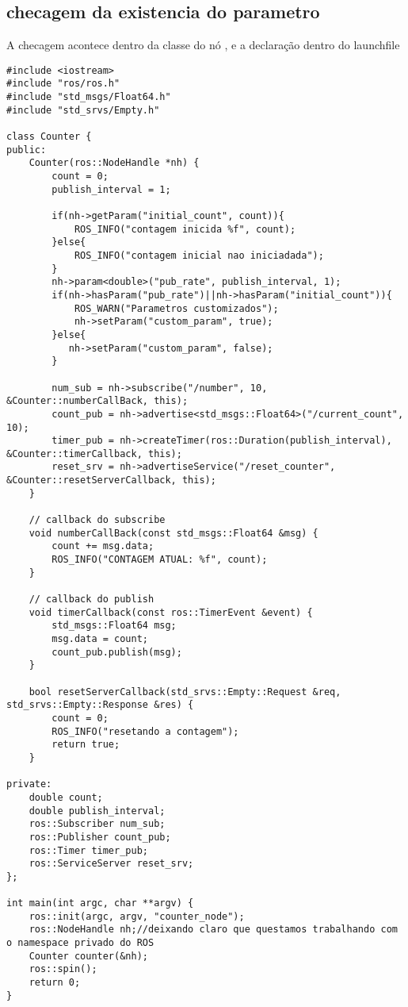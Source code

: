 \documentclass[letterpaper]{article}
\begin{document}
\subsection{checagem da existencia do parametro}
A checagem acontece dentro da classe do nó , e a declaração dentro do launchfile
\begin{lstlisting}[style=cppStyle, title=counter.cpp]
#include <iostream>
#include "ros/ros.h"
#include "std_msgs/Float64.h"
#include "std_srvs/Empty.h"

class Counter {
public:
    Counter(ros::NodeHandle *nh) {
        count = 0;                                                                           
        publish_interval = 1;

        if(nh->getParam("initial_count", count)){
            ROS_INFO("contagem inicida %f", count);
        }else{
            ROS_INFO("contagem inicial nao iniciadada");
        }
        nh->param<double>("pub_rate", publish_interval, 1);
        if(nh->hasParam("pub_rate")||nh->hasParam("initial_count")){
            ROS_WARN("Parametros customizados");
            nh->setParam("custom_param", true);
        }else{
           nh->setParam("custom_param", false); 
        }

        num_sub = nh->subscribe("/number", 10, &Counter::numberCallBack, this);
        count_pub = nh->advertise<std_msgs::Float64>("/current_count", 10);
        timer_pub = nh->createTimer(ros::Duration(publish_interval), &Counter::timerCallback, this);
        reset_srv = nh->advertiseService("/reset_counter", &Counter::resetServerCallback, this);
    }

    // callback do subscribe
    void numberCallBack(const std_msgs::Float64 &msg) {
        count += msg.data;
        ROS_INFO("CONTAGEM ATUAL: %f", count);
    }

    // callback do publish
    void timerCallback(const ros::TimerEvent &event) {
        std_msgs::Float64 msg;
        msg.data = count;
        count_pub.publish(msg); 
    }

    bool resetServerCallback(std_srvs::Empty::Request &req, std_srvs::Empty::Response &res) {
        count = 0;
        ROS_INFO("resetando a contagem");
        return true;
    }

private:
    double count;
    double publish_interval;
    ros::Subscriber num_sub;
    ros::Publisher count_pub;
    ros::Timer timer_pub;
    ros::ServiceServer reset_srv;
};

int main(int argc, char **argv) {
    ros::init(argc, argv, "counter_node");
    ros::NodeHandle nh;//deixando claro que questamos trabalhando com o namespace privado do ROS
    Counter counter(&nh);
    ros::spin();
    return 0;
}

\end{lstlisting}
\end{document}
